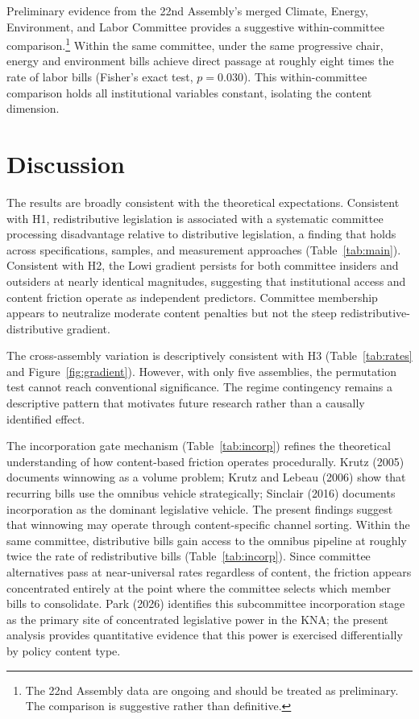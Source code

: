 \documentclass[11pt]{article}
\begin{document}
Preliminary evidence from the 22nd Assembly's merged Climate, Energy, Environment, and Labor Committee provides a suggestive within-committee comparison.\footnote{The 22nd Assembly data are ongoing and should be treated as preliminary. The comparison is suggestive rather than definitive.} Within the same committee, under the same progressive chair, energy and environment bills achieve direct passage at roughly eight times the rate of labor bills (Fisher's exact test, $p = 0.030$). This within-committee comparison holds all institutional variables constant, isolating the content dimension.


\section{Discussion}
\label{sec:discussion}

The results are broadly consistent with the theoretical expectations. Consistent with H1, redistributive legislation is associated with a systematic committee processing disadvantage relative to distributive legislation, a finding that holds across specifications, samples, and measurement approaches (Table~\ref{tab:main}). Consistent with H2, the Lowi gradient persists for both committee insiders and outsiders at nearly identical magnitudes, suggesting that institutional access and content friction operate as independent predictors. Committee membership appears to neutralize moderate content penalties but not the steep redistributive-distributive gradient.

The cross-assembly variation is descriptively consistent with H3 (Table~\ref{tab:rates} and Figure~\ref{fig:gradient}). However, with only five assemblies, the permutation test cannot reach conventional significance. The regime contingency remains a descriptive pattern that motivates future research rather than a causally identified effect.

The incorporation gate mechanism (Table~\ref{tab:incorp}) refines the theoretical understanding of how content-based friction operates procedurally. Krutz (2005) documents winnowing as a volume problem; Krutz and Lebeau (2006) show that recurring bills use the omnibus vehicle strategically; Sinclair (2016) documents incorporation as the dominant legislative vehicle. The present findings suggest that winnowing may operate through content-specific channel sorting. Within the same committee, distributive bills gain access to the omnibus pipeline at roughly twice the rate of redistributive bills (Table~\ref{tab:incorp}). Since committee alternatives pass at near-universal rates regardless of content, the friction appears concentrated entirely at the point where the committee selects which member bills to consolidate. Park (2026) identifies this subcommittee incorporation stage as the primary site of concentrated legislative power in the KNA; the present analysis provides quantitative evidence that this power is exercised differentially by policy content type.
\end{document}
